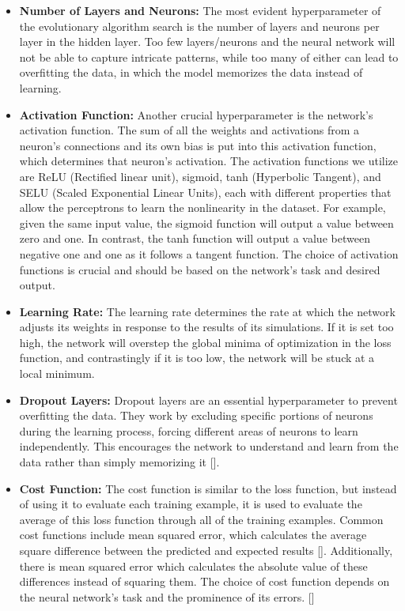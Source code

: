 \begin{itemize}

    \item \textbf{Number of Layers and Neurons:} The most evident hyperparameter of the evolutionary algorithm search is the number of layers and neurons per layer in the hidden layer. Too few layers/neurons and the neural network will not be able to capture intricate patterns, while too many of either can lead to overfitting the data, in which the model memorizes the data instead of learning.
    
    \item \textbf{Activation Function:} Another crucial hyperparameter is the network's activation function. The sum of all the weights and activations from a neuron's connections and its own bias is put into this activation function, which determines that neuron's activation. The activation functions we utilize are ReLU (Rectified linear unit), sigmoid, tanh (Hyperbolic Tangent), and SELU (Scaled Exponential Linear Units), each with different properties that allow the perceptrons to learn the nonlinearity in the dataset. For example, given the same input value, the sigmoid function will output a value between zero and one. In contrast, the tanh function will output a value between negative one and one as it follows a tangent function. The choice of activation functions is crucial and should be based on the network's task and desired output. 


    \item \textbf{Learning Rate:} The learning rate determines the rate at which the network adjusts its weights in response to the results of its simulations. If it is set too high, the network will overstep the global minima of optimization in the loss function, and contrastingly if it is too low, the network will be stuck at a local minimum.

    \item \textbf{Dropout Layers:} Dropout layers are an essential hyperparameter to prevent overfitting the data. They work by excluding specific portions of neurons during the learning process, forcing different areas of neurons to learn independently. This encourages the network to understand and learn from the data rather than simply memorizing it [\cite{example6}].


    \item  \textbf{Cost Function:} The cost function is similar to the loss function, but instead of using it to evaluate each training example, it is used to evaluate the average of this loss function through all of the training examples. Common cost functions include mean squared error, which calculates the average square difference between the predicted and expected results [\cite{example1}]. Additionally, there is mean squared error which calculates the absolute value of these differences instead of squaring them. The choice of cost function depends on the neural network's task and the prominence of its errors. 
    [\cite{example9}]


\end{itemize}

